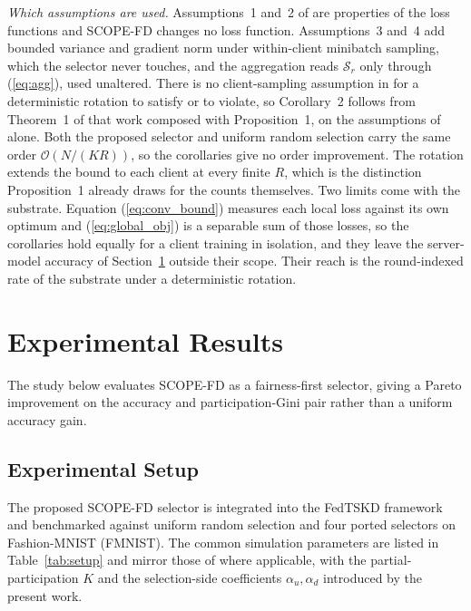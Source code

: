 \documentclass[journal]{IEEEtran}
\newcommand{\rev}[1]{#1}
\begin{document}
\rev{\textit{Which assumptions are used.} Assumptions~1 and~2 of \cite{mu2024fedtskd} are properties of the loss functions and SCOPE-FD changes no loss function. Assumptions~3 and~4 add bounded variance and gradient norm under within-client minibatch sampling, which the selector never touches, and the aggregation reads $\mathcal{S}_r$ only through (\ref{eq:agg}), used unaltered. There is no client-sampling assumption in \cite{mu2024fedtskd} for a deterministic rotation to satisfy or to violate, so Corollary~2 follows from Theorem~1 of that work composed with Proposition~1, on the assumptions of \cite{mu2024fedtskd} alone. Both the proposed selector and uniform random selection carry the same order $\mathcal{O}(N/(KR))$, so the corollaries give no order improvement. The rotation extends the bound to each client at every finite $R$, which is the distinction Proposition~1 already draws for the counts themselves. Two limits come with the substrate. Equation (\ref{eq:conv_bound}) measures each local loss against its own optimum and (\ref{eq:global_obj}) is a separable sum of those losses, so the corollaries hold equally for a client training in isolation, and they leave the server-model accuracy of Section~\ref{sec:experiments} outside their scope. Their reach is the round-indexed rate of the substrate under a deterministic rotation.}

\section{Experimental Results}
\label{sec:experiments}

The study below evaluates SCOPE-FD as a fairness-first selector, giving a Pareto improvement on the accuracy and participation-Gini pair rather than a uniform accuracy gain.

\subsection{Experimental Setup}
\label{ssec:exp-setup}

The proposed SCOPE-FD selector is integrated into the FedTSKD framework \cite{mu2024fedtskd} and benchmarked against uniform random selection and four ported selectors on Fashion-MNIST (FMNIST). The common simulation parameters are listed in Table~\ref{tab:setup} and mirror those of \cite{mu2024fedtskd} where applicable, with the partial-participation $K$ and the selection-side coefficients $\alpha_u, \alpha_d$ introduced by the present work.
\end{document}
